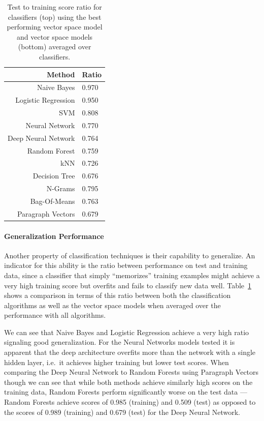 \begin{table}
  \centering
\begin{tabular}{ r l }
  \toprule
  Method & Ratio \\
  \midrule
  Naive Bayes & 0.970 \\
  Logistic Regression & 0.950 \\
  SVM & 0.808 \\
  Neural Network & 0.770 \\
  Deep Neural Network & 0.764 \\
  Random Forest & 0.759 \\
  kNN & 0.726 \\
  Decision Tree & 0.676 \\
  \midrule
  N-Grams & 0.795 \\
  Bag-Of-Means & 0.763 \\
  Paragraph Vectors & 0.679 \\
  \bottomrule
\end{tabular}
\caption{Test to training score ratio for classifiers (top) using the best performing vector space model and vector space models (bottom) averaged over classifiers.}
\label{tab:Test/Training Ratio}
\end{table}

\paragraph{Generalization Performance}
\label{par:Generalization Performance}

Another property of classification techniques is their capability to generalize. An indicator for this ability is the ratio between performance on test and training data, since a classifier that simply ``memorizes'' training examples might achieve a very high training score but overfits and fails to classify new data well. Table~\ref{tab:Test/Training Ratio} shows a comparison in terms of this ratio between both the classification algorithms as well as the vector space models when averaged over the performance with all algorithms.

We can see that Naive Bayes and Logistic Regression achieve a very high ratio signaling good generalization.
For the Neural Networks models tested it is apparent that the deep architecture overfits more than the network with a single hidden layer, i.e.\ it achieves higher training but lower test scores. When comparing the Deep Neural Network to Random Forests using Paragraph Vectors though we can see that while both methods achieve similarly high scores on the training data, Random Forests perform significantly worse on the test data --- Random Forests achieve scores of 0.985 (training) and 0.509 (test) as opposed to the scores of 0.989 (training) and 0.679 (test) for the Deep Neural Network.

